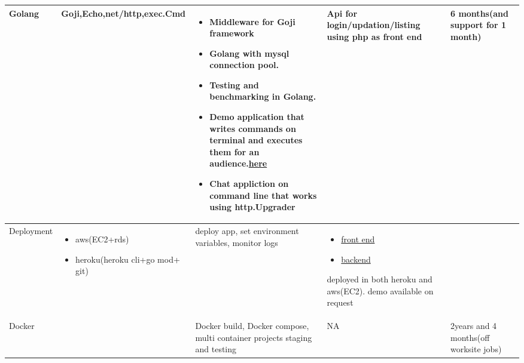 \begin{center}
\begin{tabular}{|p{1.5cm}|p{2cm}|p{7cm}|p{7cm}|p{2cm}| }
    Golang
    & Goji,Echo,net/http,exec.Cmd
    & \begin{itemize} 
	\item Middleware  for Goji framework  
	\item Golang with mysql connection pool.
	\item Testing and benchmarking in Golang. 
	\item Demo application that writes commands on terminal and
	    executes them for an
	    audience.\href{https://github.com/kurianCoding/comma}{here}
	\item Chat appliction on command line that works using
	    http.Upgrader
	\end{itemize}
    & Api for login/updation/listing using php as front end  
    & 6 months(and support for 1 month)\\
\hline

    Deployment 
    & \begin{itemize}
	\item aws(EC2+rds) 
	\item heroku(heroku
    cli+go mod+ git) 
    \end{itemize}
    & deploy app, set environment variables, monitor logs
    & \begin{itemize} 
	    \item \href{https://kuriancoding.github.io/graph.html}{front end}
	    \item \href{https://github.com/kurianCoding/demoback}{backend} 
    \end{itemize} 
    deployed in both heroku and aws(EC2).
    demo available on request
    & \\ 
\hline

 Docker 
& 
    & Docker build, Docker compose, multi container projects
    staging and testing 
& NA 
    &  2years and 4 months(off worksite jobs)\\
\hline
\end{tabular}
\end{center}
